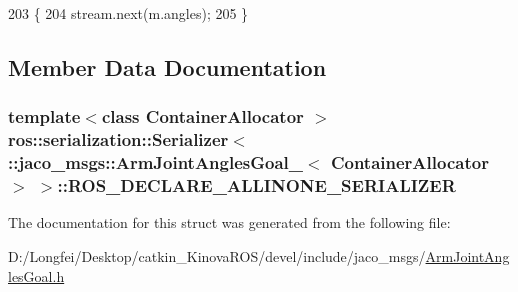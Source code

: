 \begin{DoxyCode}
203     \{
204       stream.next(m.angles);
205     \}
\end{DoxyCode}


\subsection{Member Data Documentation}
\subsubsection[{\texorpdfstring{R\+O\+S\+\_\+\+D\+E\+C\+L\+A\+R\+E\+\_\+\+A\+L\+L\+I\+N\+O\+N\+E\+\_\+\+S\+E\+R\+I\+A\+L\+I\+Z\+ER}{ROS_DECLARE_ALLINONE_SERIALIZER}}]{\setlength{\rightskip}{0pt plus 5cm}template$<$class Container\+Allocator $>$ ros\+::serialization\+::\+Serializer$<$ \+::{\bf jaco\+\_\+msgs\+::\+Arm\+Joint\+Angles\+Goal\+\_\+}$<$ Container\+Allocator $>$ $>$\+::R\+O\+S\+\_\+\+D\+E\+C\+L\+A\+R\+E\+\_\+\+A\+L\+L\+I\+N\+O\+N\+E\+\_\+\+S\+E\+R\+I\+A\+L\+I\+Z\+ER}\hypertarget{structros_1_1serialization_1_1Serializer_3_01_1_1jaco__msgs_1_1ArmJointAnglesGoal___3_01ContainerAllocator_01_4_01_4_a0f356324ce98ef0a0c51eab31c72525a}{}\label{structros_1_1serialization_1_1Serializer_3_01_1_1jaco__msgs_1_1ArmJointAnglesGoal___3_01ContainerAllocator_01_4_01_4_a0f356324ce98ef0a0c51eab31c72525a}


The documentation for this struct was generated from the following file\+:\begin{DoxyCompactItemize}
\item 
D\+:/\+Longfei/\+Desktop/catkin\+\_\+\+Kinova\+R\+O\+S/devel/include/jaco\+\_\+msgs/\hyperlink{ArmJointAnglesGoal_8h}{Arm\+Joint\+Angles\+Goal.\+h}\end{DoxyCompactItemize}
